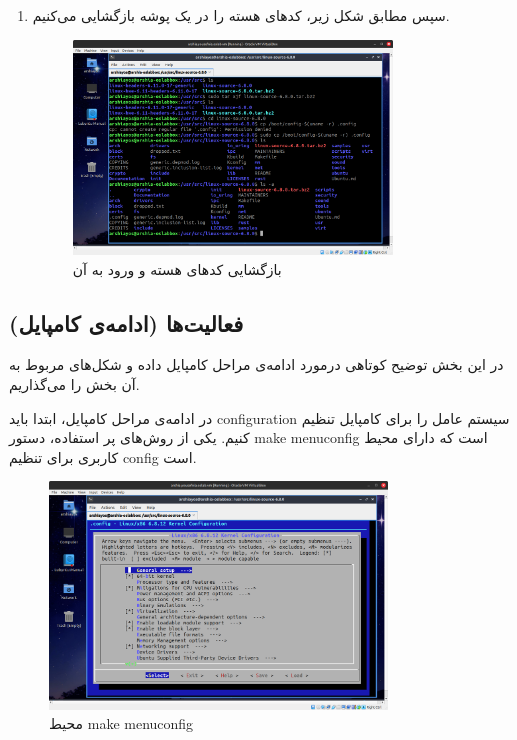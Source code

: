\documentclass[12pt]{article}
\begin{document}
\begin{enumerate}
        \item سپس مطابق شکل زیر، کدهای هسته را در یک  پوشه بازگشایی می‌کنیم.

        \begin{figure}[H]
		\centering
		\includegraphics[width=0.8\textwidth]{report1-resources/36.png}
		\caption{بازگشایی کدهای هسته و ورود به آن}
	\end{figure}
        \end{enumerate}

        \subsection{فعالیت‌ها (ادامه‌ی کامپایل)}
        در این بخش توضیح کوتاهی درمورد ادامه‌ی مراحل کامپایل داده و شکل‌های مربوط به آن بخش را می‌گذاریم. 

        در ادامه‌ی مراحل کامپایل، ابتدا باید 
        configuration
        سیستم عامل را برای کامپایل تنظیم کنیم. یکی از روش‌های پر استفاده، دستور 
        \textenglish{make menuconfig}
        است که دارای محیط کاربری برای تنظیم 
        config
        است.

        \begin{figure}[H]
		\centering
		\includegraphics[width=0.8\textwidth]{report1-resources/37.png}
		\caption{محیط \textenglish{make menuconfig}}
	\end{figure}
\end{document}
